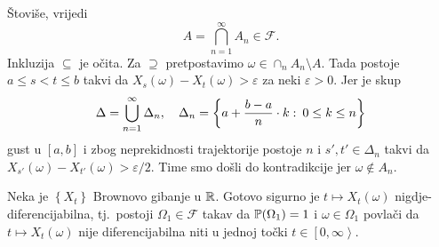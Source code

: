\documentclass[main.tex]{subfiles}
\begin{document}
\begin{komentar}
	Štoviše, vrijedi
	\begin{equation}
		A = \bigcap_{n=1}^{\infty} A_n \in \mathcal F.
	\end{equation}
	Inkluzija \( \subseteq \) je očita. Za \( \supseteq \) pretpostavimo \( \omega \in \cap_n A_n \setminus A \). Tada postoje \( a \le s < t \le b \) takvi da \( X_s(\omega) - X_t(\omega) > \varepsilon \) za neki \( \varepsilon > 0 \). Jer je skup
	\[ \Delta = \bigcup_{n=1}^\infty \Delta_n, \quad \Delta_n = \left\{ a + \frac{b-a}n \cdot k \st 0 \le k \le n \right\}   \]
	gust u \( \left[ a,b \right] \) i zbog neprekidnosti trajektorije postoje \( n \) i \( s', t' \in \Delta_n \)
	takvi da \( X_{s'}(\omega) - X_{t'}(\omega) > \varepsilon/2  \). Time smo došli do kontradikcije jer \( \omega \not \in A_n \).
\end{komentar}


\begin{teorem}
	Neka je \( \left\{ X_t \right\} \) Brownovo gibanje u \( \R \). Gotovo sigurno je \( t \mapsto X_t(\omega) \) nigdje-diferencijabilna, tj.\
	postoji \( \Omega_1 \in \mathcal F \) takav da \( \P(\Omega_1)=1 \) i \( \omega \in \Omega_1 \) povlači da \( t \mapsto X_t(\omega) \)
	nije diferencijabilna niti u jednoj točki \( t \in \left[ 0, \infty \right\rangle \).
\end{teorem}
\end{document}

